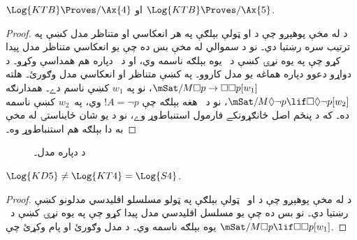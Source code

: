 \documentclass[../../../include/open-logic-section]{subfiles}
\begin{document}
\begin{thm}
  $\Log{KTB} \Proves/ \Ax{4}$ او $\Log{KTB} \Proves/ \Ax{5}$.
\end{thm}

\begin{proof}
  د  له مخې پوهېږو چې د  او
   ټولې بېلګې په هر انعکاسي او متناظر مدل کښې په ترتيب سره
  رښتيا دي۔ نو د سموالي له مخې بس ده چې يو انعکاسي متناظر مدل پيدا
  کړو چې په يوه نړۍ کښې د~ يوه بېلګه ناسمه وي، او د~
  دپاره هم همداسې وکړو۔ د دواړو دعوو دپاره هماغه يو مدل کاروو۔ په
   کښې متناظر او انعکاسي مدل وګورئ۔ هلته
  $\mSat/{M}{\Box p \to \Box \Box
    p}[w_1]$، نو  په $w_1$ کښې ناسم دے۔ همدارنګه
  $\mSat/{M}{\Diamond
    \lnot p \lif \Box \Diamond \lnot p}[w_2]$، نو د~ هغه
  بېلګه چې $!A = \lnot p$ وي، په~$w_2$ کښې ناسمه ده۔
  که د پنځم اصل ځانګړونکے فارمول استنباط‌وړ وے، نو د يو شان
  ځايناستۍ له مخې به دا بېلګه هم استنباط‌وړ وه۔
\end{proof}

\begin{figure}[htpb]
  \centering
  \caption{د  دپاره مدل۔}
\end{figure}

\begin{thm}
  $\Log{KD5} \neq \Log{KT4} = \Log{S4}$.
\end{thm}

\begin{proof}
  د  له مخې پوهېږو چې د 
  او~ ټولې بېلګې په ټولو مسلسلو اقليدسي مدلونو کښې رښتيا دي۔
  نو بس ده چې يو مسلسل اقليدسي مدل پيدا کړو چې په يوه نړۍ کښې د~
  يوه بېلګه ناسمه وي۔ د  مدل وګورئ او پام وکړئ
  چې $\mSat/{M}{\Box p
  \lif \Box\Box p}[w_1]$.
\end{proof}
\end{document}
